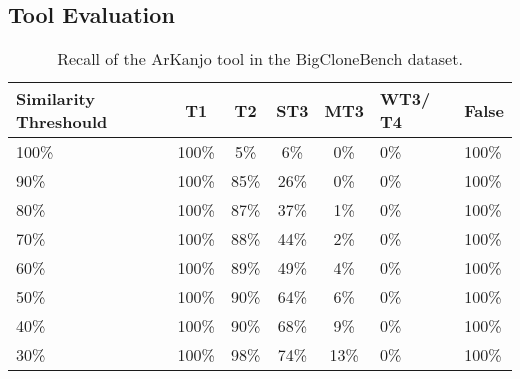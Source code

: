 \documentclass[conference]{IEEEtran}
\begin{document}
\subsection{Tool Evaluation}

\begin{table}[!t]

\centering
\caption{Recall of the ArKanjo tool in the BigCloneBench dataset.}
\renewcommand{\arraystretch}{1.3}
\begin{tabular}{ | m{13mm} | c | c | c | c | m{6mm} | m{6mm} | }

\hline

\textbf{Similarity Threshould} & \textbf{T1} & \textbf{T2} & ST3 & MT3
& WT3/ T4 & \textbf{False} \\ \hline

100\% & 100\% & 5\% & 6\% & 0\% & 0\% & 100\% \\ \hline
90\% & 100\% & 85\% & 26\% & 0\% & 0\% & 100\% \\ \hline
80\% & 100\% & 87\% & 37\% & 1\% & 0\% & 100\% \\ \hline
70\% & 100\% & 88\% & 44\% & 2\% & 0\% & 100\% \\ \hline
60\% & 100\% & 89\% & 49\% & 4\% & 0\% & 100\% \\ \hline
50\% & 100\% & 90\% & 64\% & 6\% & 0\% & 100\% \\ \hline
40\% & 100\% & 90\% & 68\% & 9\% & 0\% & 100\% \\ \hline
30\% & 100\% & 98\% & 74\% & 13\% & 0\% & 100\% \\ \hline

\hline
\end{tabular}

\label{tab:bigclone}
\end{table}
\end{document}
